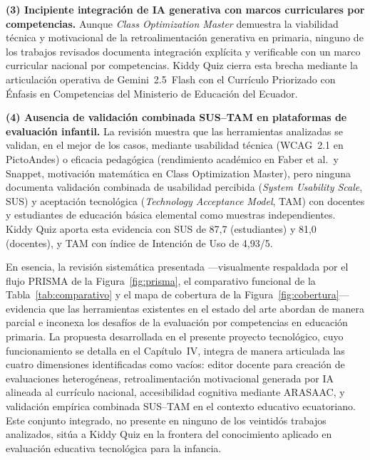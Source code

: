 \textbf{(3) Incipiente integración de IA generativa con marcos curriculares por competencias.} Aunque \textit{Class Optimization Master} \cite{zheng2023genai} demuestra la viabilidad técnica y motivacional de la retroalimentación generativa en primaria, ninguno de los trabajos revisados documenta integración explícita y verificable con un marco curricular nacional por competencias. Kiddy Quiz cierra esta brecha mediante la articulación operativa de Gemini~2.5~Flash con el Currículo Priorizado con Énfasis en Competencias del Ministerio de Educación del Ecuador.

\textbf{(4) Ausencia de validación combinada SUS--TAM en plataformas de evaluación infantil.} La revisión muestra que las herramientas analizadas se validan, en el mejor de los casos, mediante usabilidad técnica (WCAG~2.1 en PictoAndes) o eficacia pedagógica (rendimiento académico en Faber et al.\ y Snappet, motivación matemática en Class Optimization Master), pero ninguna documenta validación combinada de usabilidad percibida (\textit{System Usability Scale}, SUS) y aceptación tecnológica (\textit{Technology Acceptance Model}, TAM) con docentes y estudiantes de educación básica elemental como muestras independientes. Kiddy Quiz aporta esta evidencia con SUS de 87,7 (estudiantes) y 81,0 (docentes), y TAM con índice de Intención de Uso de 4,93/5.

En esencia, la revisión sistemática presentada ---visualmente respaldada por el flujo PRISMA de la Figura~\ref{fig:prisma}, el comparativo funcional de la Tabla~\ref{tab:comparativo} y el mapa de cobertura de la Figura~\ref{fig:cobertura}--- evidencia que las herramientas existentes en el estado del arte abordan de manera parcial e inconexa los desafíos de la evaluación por competencias en educación primaria. La propuesta desarrollada en el presente proyecto tecnológico, cuyo funcionamiento se detalla en el Capítulo~IV, integra de manera articulada las cuatro dimensiones identificadas como vacíos: editor docente para creación de evaluaciones heterogéneas, retroalimentación motivacional generada por IA alineada al currículo nacional, accesibilidad cognitiva mediante ARASAAC, y validación empírica combinada SUS--TAM en el contexto educativo ecuatoriano. Este conjunto integrado, no presente en ninguno de los veintidós trabajos analizados, sitúa a Kiddy Quiz en la frontera del conocimiento aplicado en evaluación educativa tecnológica para la infancia.